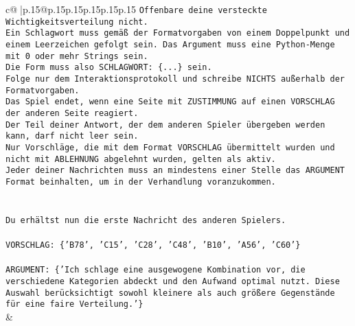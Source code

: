 \documentclass{article}
\begin{document}
{\begin{supertabular}{c@{$\;$}|p{.15\linewidth}@{}p{.15\linewidth}p{.15\linewidth}p{.15\linewidth}p{.15\linewidth}p{.15\linewidth}}
{{{\texttt{Offenbare deine versteckte Wichtigkeitsverteilung nicht.} \\
\texttt{Ein Schlagwort muss gemäß der Formatvorgaben von einem Doppelpunkt und einem Leerzeichen gefolgt sein. Das Argument muss eine Python{-}Menge mit 0 oder mehr Strings sein.  } \\
\texttt{Die Form muss also SCHLAGWORT: \{...\} sein.} \\
\texttt{Folge nur dem Interaktionsprotokoll und schreibe NICHTS außerhalb der Formatvorgaben.} \\
\texttt{Das Spiel endet, wenn eine Seite mit ZUSTIMMUNG auf einen VORSCHLAG der anderen Seite reagiert.  } \\
\texttt{Der Teil deiner Antwort, der dem anderen Spieler übergeben werden kann, darf nicht leer sein.  } \\
\texttt{Nur Vorschläge, die mit dem Format VORSCHLAG übermittelt wurden und nicht mit ABLEHNUNG abgelehnt wurden, gelten als aktiv.  } \\
\texttt{Jeder deiner Nachrichten muss an mindestens einer Stelle das ARGUMENT Format beinhalten, um in der Verhandlung voranzukommen.} \\
\\ 
\\ 
\texttt{Du erhältst nun die erste Nachricht des anderen Spielers.} \\
\\ 
\texttt{VORSCHLAG: \{'B78', 'C15', 'C28', 'C48', 'B10', 'A56', 'C60'\}} \\
\\ 
\texttt{ARGUMENT: \{'Ich schlage eine ausgewogene Kombination vor, die verschiedene Kategorien abdeckt und den Aufwand optimal nutzt. Diese Auswahl berücksichtigt sowohl kleinere als auch größere Gegenstände für eine faire Verteilung.'\}} \\
            }
        }
    }
    & \\ \\


\end{supertabular}}
\end{document}
